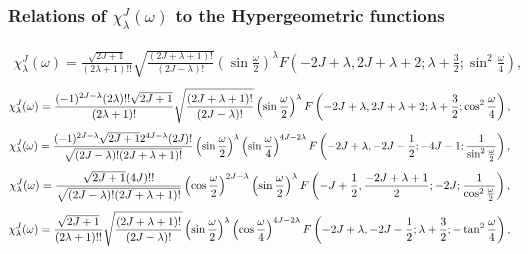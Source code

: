 \subsubsection{ Relations of $\chi_{\lambda}^{J}(\omega)$ to the Hypergeometric functions}
\begin{gather}
\chi_{\lambda}^{J}(\omega)=\frac{\sqrt{2 J+1}}{(2 \lambda+1)!!} \sqrt{\frac{(2 J+\lambda+1)!}{(2 J-\lambda)!}}\left(\sin \frac{\omega}{2}\right)^{\lambda} F\left(-2 J+\lambda, 2 J+\lambda+2 ; \lambda+\frac{3}{2} ; \sin ^{2} \frac{\omega}{4}\right) , \label{eq:4:15:9}
\end{gather}
\begin{gather}
\chi_{\lambda}^{J}(\omega)=\frac{(-1)^{2 J-\lambda}(2 \lambda)!!\sqrt{2 J+1}}{(2 \lambda+1)!} \sqrt{\frac{(2 J+\lambda+1)!}{(2 J-\lambda)!}}\left(\sin \frac{\omega}{2}\right)^{\lambda} F\left(-2 J+\lambda, 2 J+\lambda+2 ; \lambda+\frac{3}{2} ; \cos ^{2} \frac{\omega}{4}\right) , \notag\\ \label{eq:4:15:10}
\end{gather}
\begin{gather}
\chi_{\lambda}^{J}(\omega)=\frac{(-1)^{2 J-\lambda} \sqrt{2 J+1} 2^{4 J-\lambda}(2 J)!}{\sqrt{(2 J-\lambda)!(2 J+\lambda+1)!}}\left(\sin \frac{\omega}{2}\right)^{\lambda}\left(\sin \frac{\omega}{4}\right)^{4 J-2 \lambda}  
F\left(-2 J+\lambda,-2 J-\frac{1}{2} ;-4 J-1 ; \frac{1}{\sin ^{2} \frac{\omega}{2}}\right) , \notag\\ \label{eq:4:15:11}
\end{gather}
\begin{gather}
\chi_{\lambda}^{J}(\omega)=\frac{\sqrt{2 J+1}(4 J)!!}{\sqrt{(2 J-\lambda)!(2 J+\lambda+1)!}}\left(\cos \frac{\omega}{2}\right)^{2 J-\lambda}\left(\sin \frac{\omega}{2}\right)^{\lambda}  %
F\left(-J+\frac{1}{2}, \frac{-2 J+\lambda+1}{2} ;-2 J ; \frac{1}{\cos ^{2} \frac{\omega}{2}}\right) , \notag\\\label{eq:4:15:12}
\end{gather}
\begin{gather}
\chi_{\lambda}^{J}(\omega)=\frac{\sqrt{2 J+1}}{(2 \lambda+1)!!} \sqrt{\frac{(2 J+\lambda+1)!}{(2 J-\lambda)!}}\left(\sin \frac{\omega}{2}\right)^{\lambda}\left(\cos \frac{\omega}{4}\right)^{4 J-2 \lambda}  %
F\left(-2 J+\lambda,-2 J-\frac{1}{2} ; \lambda+\frac{3}{2} ;-\tan ^{2} \frac{\omega}{4}\right), \notag\\ \label{eq:4:15:13}
\end{gather}
